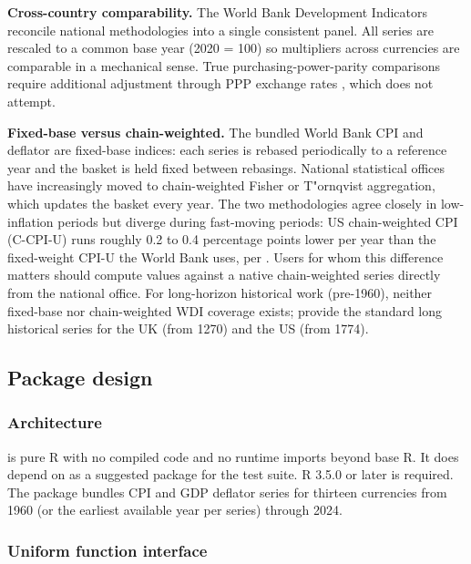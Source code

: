 \textbf{Cross-country comparability.} The World Bank Development
Indicators reconcile national methodologies into a single consistent
panel. All series are rescaled to a common base year (2020 = 100) so
multipliers across currencies are comparable in a mechanical sense. True
purchasing-power-parity comparisons require additional adjustment
through PPP exchange rates \citep{deaton2010price}, which
 does not attempt.

\textbf{Fixed-base versus chain-weighted.} The bundled World Bank CPI
and deflator are fixed-base indices: each series is rebased periodically
to a reference year and the basket is held fixed between rebasings.
National statistical offices have increasingly moved to chain-weighted
Fisher or T"ornqvist aggregation, which updates the basket every year.
The two methodologies agree closely in low-inflation periods but diverge
during fast-moving periods: US chain-weighted CPI (C-CPI-U) runs roughly
0.2 to 0.4 percentage points lower per year than the fixed-weight CPI-U
the World Bank uses, per \citet{moulton2018measurement}. Users for whom
this difference matters should compute values against a native
chain-weighted series directly from the national office. For
long-horizon historical work (pre-1960), neither fixed-base nor
chain-weighted WDI coverage exists; \citet{officer2024measuringworth}
provide the standard long historical series for the UK (from 1270) and
the US (from 1774).

\subsection{Package design}\label{package-design}

\subsubsection{Architecture}\label{architecture}

 is pure R with no compiled code and no runtime
imports beyond base R. It does depend on  as a
suggested package for the test suite. R 3.5.0 or later is required. The
package bundles CPI and GDP deflator series for thirteen currencies from
1960 (or the earliest available year per series) through 2024.

\subsubsection{Uniform function
interface}\label{uniform-function-interface}

